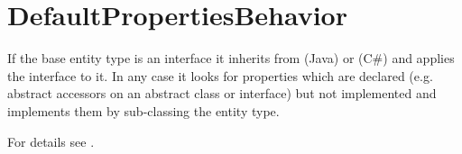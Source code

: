 \section{DefaultPropertiesBehavior}
\label{feature:DefaultPropertiesBehavior}
\ClearAPI
If the base entity type is an interface it inherits from  (Java) or  (C\#) and applies the interface to it. In any case it looks for properties which are declared (e.g. abstract accessors on an abstract class or interface) but not implemented and implements them by sub-classing the entity type.

For details see .